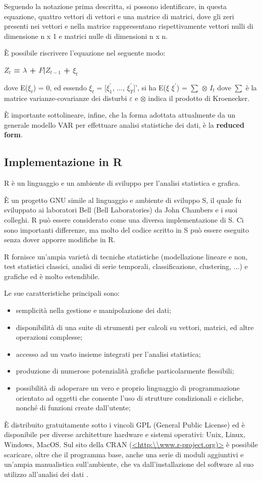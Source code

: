 \documentclass[12pt,a4paper,twoside,openright]{book}
\begin{document}
Seguendo la notazione prima descritta, si possono identificare, in questa equazione, quattro vettori di vettori e una matrice di matrici, dove gli zeri presenti nei vettori e nella matrice rappresentano rispettivamente vettori nulli di dimensione n x 1 e matrici nulle di dimensioni n x n. 

È possibile riscrivere l'equazione nel seguente modo: 
\begin{center}
{\bfseries
$Z_t$ = $\lambda$ + $F$|$Z_{t-1}$ + $\xi_t$
}
\end{center}
dove E($\xi_t$) = 0, ed essendo $\xi_t$ = [$\xi^{'}_1$, $\dots$, $\xi^{'}_T$]', si ha E($\xi$ $\xi^{'}$) = $\sum$ $\otimes$ $I_t$ dove $\sum$ è la matrice varianze-covarianze dei disturbi $\varepsilon$ e $\otimes$ indica il prodotto di Kroenecker.
\medskip

È importante sottolineare, infine, che la forma adottata attualmente da un generale modello VAR per effettuare analisi statistiche dei dati, è la {\bfseries reduced form}.
\newpage
\subsection{Implementazione in R}
R è un linguaggio e un ambiente di sviluppo per l'analisi statistica e grafica.

È un progetto GNU simile al linguaggio e ambiente di sviluppo S, il quale fu sviluppato ai laboratori Bell (Bell Laboratories) da John Chambers e i suoi colleghi. R può essere considerato come una diversa implementazione di S. Ci sono importanti differenze, ma molto del codice scritto in S può essere eseguito senza dover apporre modifiche in R. 

R fornisce un'ampia varietà di tecniche statistiche (modellazione lineare e non, test statistici classici, analisi di serie temporali, classificazione, clustering, $\dots$) e grafiche ed è molto estendibile. 

Le sue caratteristiche principali sono:
\begin{itemize}
\item semplicità nella gestione e manipolazione dei dati;
\item disponibilità di una suite di strumenti per calcoli su vettori, matrici, ed altre operazioni complesse;
\item accesso ad un vasto insieme integrati per l'analisi statistica;
\item produzione di numerose potenzialità grafiche particolarmente flessibili;
\item possibilità di adoperare un vero e proprio linguaggio di programmazione orientato ad oggetti che consente l'uso di strutture condizionali e cicliche, nonché di funzioni create dall'utente;
\end{itemize}
È distribuito gratuitamente sotto i vincoli GPL (General Public License) ed è disponibile per diverse architetture hardware e sistemi operativi: Unix, Linux, Windows, MacOS. Sul sito della  CRAN (\url{<http:\\www.r-project.org)>} è possibile scaricare, oltre che il programma base, anche una serie di moduli aggiuntivi e un'ampia manualistica sull'ambiente, che va dall'installazione del software al suo utilizzo all'analisi dei dati \cite{12a}.
\end{document}
